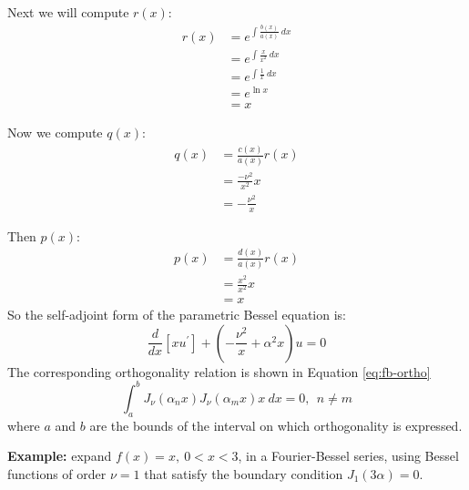 \vspace{0.25cm}

\noindent Next we will compute $r(x)$:
\begin{align*}
r(x) &= e^{\int \frac{b(x)}{a(x)} \ dx} \\
&= e^{\int \frac{x}{x^2} \ dx} \\
&= e^{\int \frac{1}{x} \ dx} \\
&= e^{\ln{x}} \\
&= x
\end{align*}

\vspace{0.25cm}

\noindent Now we compute $q(x)$:
\begin{align*}
q(x) &= \frac{c(x)}{a(x)}r(x) \\
&= \frac{-\nu^2}{x^2}x \\
&= -\frac{\nu^2}{x}
\end{align*}

\vspace{0.25cm}

\noindent Then $p(x)$:
\begin{align*}
p(x) &= \frac{d(x)}{a(x)}r(x) \\
&=\frac{x^2}{x^2}x \\
&= x
\end{align*}
So the self-adjoint form of the parametric Bessel equation is:
\begin{equation*}
\frac{d}{dx}\left[x u^{\prime} \right] + \left(-\frac{\nu^2}{x} + \alpha^2 x \right)u = 0
\end{equation*}
The corresponding orthogonality relation is shown in Equation \ref{eq:fb-ortho}
\begin{equation}
\int_{a}^{b}J_{\nu}(\alpha_n x) J_{\nu}(\alpha_m x) x \ dx = 0, \ \ n \ne m
\label{eq:fb-ortho}
\end{equation}
where $a$ and $b$ are the bounds of the interval on which orthogonality is expressed.

\vspace{0.5cm}

\noindent\textbf{Example:} expand $f(x)=x, \ 0<x<3$, in a Fourier-Bessel series, using Bessel functions of order $\nu=1$ that satisfy the boundary condition $J_{1}(3\alpha)=0.$

